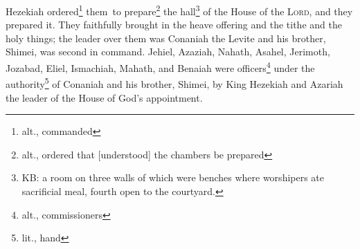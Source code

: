 \begin{inparaenum}
     Hezekiah ordered\footnote{alt., commanded} them\understood\ to prepare\footnote{alt., ordered that [understood] the chambers be prepared} the hall\footnote{KB: a room on three walls of which were benches where worshipers ate sacrificial meal, fourth open to the courtyard.} of the House of the \textsc{Lord}, and they prepared it.\understood%
     They faithfully brought in the heave offering and the tithe and the holy things; the leader over them was Conaniah the Levite and his brother, Shimei, was second in command.\understood%
     Jehiel, Azaziah, Nahath, Asahel, Jerimoth, Jozabad, Eliel, Ismachiah, Mahath, and Benaiah were officers\footnote{alt., commissioners} under the authority\footnote{lit., hand} of Conaniah and his brother, Shimei, by King Hezekiah and Azariah the leader of the House of God's appointment.%
\end{inparaenum}
